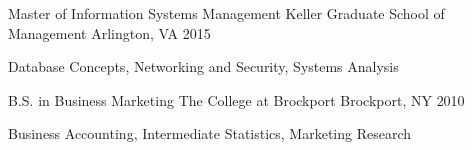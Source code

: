

\begin{cventries}


  \cventry
    {Master of Information Systems Management} %
    {Keller Graduate School of Management} %
    {Arlington, VA} %
    {2015} %
    {
      \begin{cvitems} %
        \item {Database Concepts, Networking and Security, Systems Analysis}
      \end{cvitems}
    }
  \cventry
    {B.S. in Business Marketing} %
    {The College at Brockport} %
    {Brockport, NY} %
    {2010} %
    {
      \begin{cvitems} %
        \item {Business Accounting, Intermediate Statistics, Marketing Research}
      \end{cvitems}
    }
\end{cventries}
